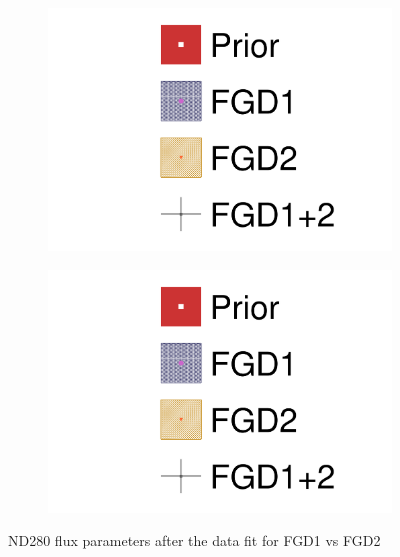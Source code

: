 \begin{figure}[h]
\begin{subfigure}[t]{0.24\textwidth}
		\includegraphics[width=\textwidth, trim={0mm 0mm 0mm 0mm}, clip,page=8]{figures/mach3/data/alt/2017b_FGD1_Data_merge_2017b_FGD2_Data_merge_2017b_NewData_NewDet_UpdXsecStep_2Xsec_4Det_5Flux_0}
	\end{subfigure}
	\begin{subfigure}[t]{0.24\textwidth}
		\includegraphics[width=\textwidth, trim={0mm 0mm 0mm 0mm}, clip,page=9]{figures/mach3/data/alt/2017b_FGD1_Data_merge_2017b_FGD2_Data_merge_2017b_NewData_NewDet_UpdXsecStep_2Xsec_4Det_5Flux_0}
	\end{subfigure}
	\caption{ND280 flux parameters after the data fit for FGD1 vs FGD2}
	\label{fig:flux_data_nd280_fdg1vsfgd2}
\end{figure}

